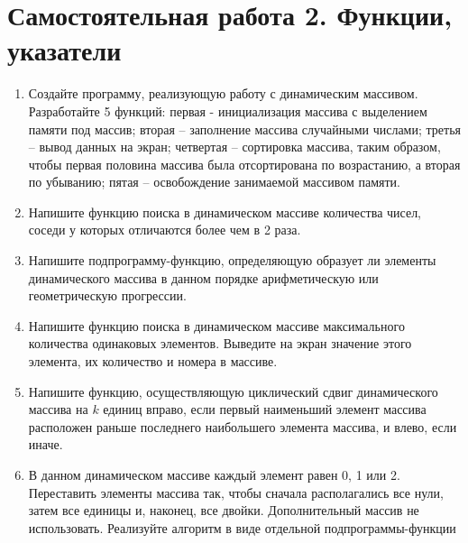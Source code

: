 \section{Самостоятельная работа 2. Функции, указатели}
\begin{enumerate}[leftmargin=*]
    \item Создайте программу, реализующую работу с динамическим массивом. Разработайте 5 функций: первая - инициализация массива с выделением памяти под массив; вторая – заполнение массива случайными числами; третья – вывод данных на экран; четвертая – сортировка массива, таким образом, чтобы первая половина массива была отсортирована по возрастанию, а вторая по убыванию; пятая – освобождение занимаемой массивом памяти.
    \item Напишите функцию поиска в динамическом массиве количества чисел, соседи у которых отличаются более чем в 2 раза.
    \item Напишите подпрограмму-функцию, определяющую образует ли элементы динамического массива в данном порядке арифметическую или геометрическую прогрессии.
    \item Напишите функцию поиска в динамическом массиве максимального количества одинаковых элементов. Выведите на экран значение этого элемента, их количество и номера в массиве.
    \item Напишите функцию, осуществляющую циклический сдвиг динамического массива на $k$ единиц вправо, если первый наименьший элемент массива расположен раньше последнего наибольшего элемента массива, и влево, если иначе.
    \item В данном динамическом массиве каждый элемент равен 0, 1  или 2. Переставить элементы массива так, чтобы сначала располагались все нули, затем все единицы и, наконец, все двойки. Дополнительный массив не использовать. Реализуйте алгоритм в виде отдельной подпрограммы-функции
\end{enumerate}